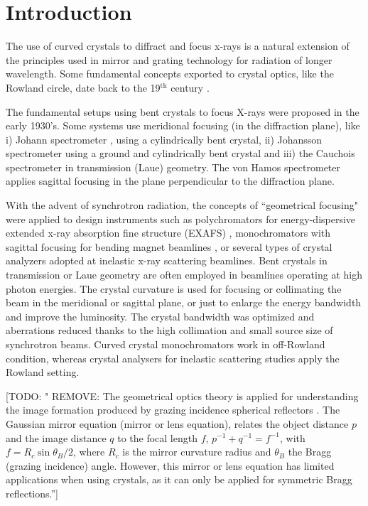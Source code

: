 \documentclass[preprint]{iucr}              %
\newcommand{\todo}[1]{{\color{red}[TODO: "#1'']}}
\newcommand{\inred}[1]{{\color{red}#1}}
\begin{document}
\section{Introduction}

The use of curved crystals to diffract and focus x-rays \inred{is} a natural extension of the principles used in mirror and grating technology for radiation of longer wavelength. Some fundamental concepts exported to crystal optics, like the Rowland circle, date back to the 19$^\text{th}$ century \cite{rowland1882}.

The fundamental setups using bent crystals to focus X-rays were proposed in the early 1930’s. Some systems use meridional focusing (in the diffraction plane), like i) Johann spectrometer \cite{Johann1931}, \inred{using} a cylindrically bent crystal,  ii) Johansson spectrometer \cite{Johansson1933} \inred{using} a ground and cylindrically bent crystal and iii) the Cauchois spectrometer \cite{cauchois1933} in transmission (Laue) geometry. The von Hamos spectrometer \cite{V.Hamos1933} applies sagittal focusing in the plane perpendicular to the diffraction plane.

With the advent of synchrotron radiation, the concepts of ``geometrical focusing" were applied to design instruments such as polychromators for energy-dispersive extended x-ray absorption fine structure (EXAFS) \cite{Tolentino:ms0206}, monochromators with sagittal focusing for bending magnet beamlines \cite{Sparks1980}, or several types of crystal analyzers adopted at inelastic x-ray scattering beamlines. Bent crystals in transmission or Laue geometry are often employed in beamlines operating at high photon energies. The crystal curvature is used for focusing or collimating the beam in the meridional \cite{Suortti1988,SuorttiShulze} or sagittal \cite{Zhong2001} plane, or just to enlarge the energy bandwidth and improve the luminosity. The crystal bandwidth was optimized and aberrations reduced thanks to \inred{the high collimation and small source size} of synchrotron beams. Curved crystal monochromators work \inred{in} off-Rowland condition, whereas crystal analysers for inelastic scattering studies apply the Rowland setting.

\todo{ REMOVE: The geometrical optics theory is applied for understanding the image formation produced by grazing incidence spherical reflectors \cite{KB1948}. The Gaussian mirror equation (mirror or lens equation), relates the object distance $p$ and the image distance $q$ to the focal length $f$, $p^{-1}+q^{-1}=f^{-1}$, with $f=R_c \sin\theta_B / 2$, where $R_c$ is the mirror curvature radius and $\theta_B$ the Bragg (grazing incidence) angle. However, this mirror or lens equation has limited applications when using crystals, as it can only be applied for symmetric Bragg reflections.}
\end{document}
